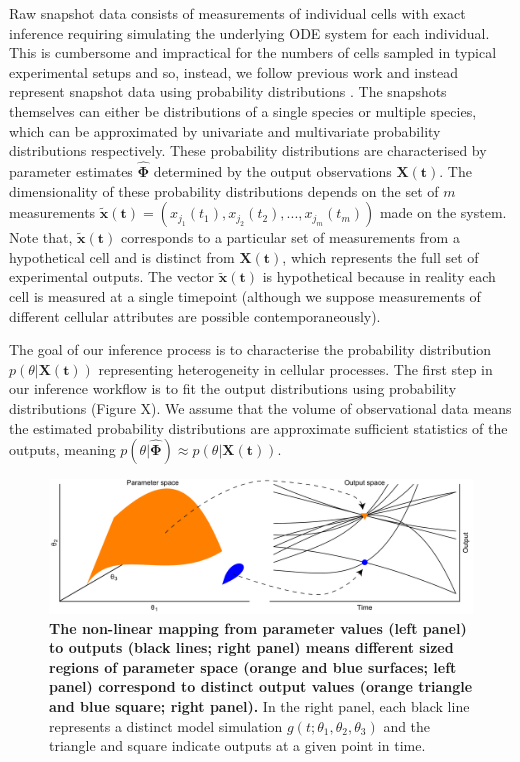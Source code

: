 \documentclass[10pt,letterpaper]{article}
\begin{document}
Raw snapshot data consists of measurements of individual cells with exact inference requiring simulating the underlying ODE system for each individual. This is cumbersome and impractical for the numbers of cells sampled in typical experimental setups and so, instead, we follow previous work and instead represent snapshot data using probability distributions \cite{hasenauer2011identification,hasenauer2014ode,loos2018hierarchical,dixit2018maximum}. The snapshots themselves can either be distributions of a single species or multiple species, which can be approximated by univariate and multivariate probability distributions respectively. These probability distributions are characterised by parameter estimates $\hat{\boldsymbol{\Phi}}$ determined by the output observations $\boldsymbol{X}(\boldsymbol{t})$. The dimensionality of these probability distributions depends on the set of $m$ measurements $\tilde{\boldsymbol{x}}(\boldsymbol{t})=(x_{j_1}(t_1), x_{j_2}(t_2), ..., x_{j_m}(t_m))$ made on the system. Note that, $\tilde{\boldsymbol{x}}(\boldsymbol{t})$ corresponds to a particular set of measurements from a hypothetical cell and is distinct from $\boldsymbol{X}(\boldsymbol{t})$, which represents the full set of experimental outputs. The vector $\tilde{\boldsymbol{x}}(\boldsymbol{t})$ is hypothetical because in reality each cell is measured at a single timepoint (although we suppose measurements of different cellular attributes are possible contemporaneously).

The goal of our inference process is to  characterise the probability distribution $p(\theta|\boldsymbol{X}(\boldsymbol{t}))$ representing heterogeneity in cellular processes. The first step in our inference workflow is to fit the output distributions using probability distributions (Figure X). We assume that the volume of observational data means the estimated probability distributions are approximate sufficient statistics of the outputs, meaning $p(\theta|\hat{\boldsymbol{\Phi}}) \approx p(\theta|\boldsymbol{X}(\boldsymbol{t}))$.

\begin{figure}[H]
	\centerline{\includegraphics[width=\textwidth]{../figures/contour_volumes.pdf}}
	\caption{\textbf{The non-linear mapping from parameter values (left panel) to outputs (black lines; right panel) means different sized regions of parameter space (orange and blue surfaces; left panel) correspond to distinct output values (orange triangle and blue square; right panel).} In the right panel, each black line represents a distinct model simulation $g(t; \theta_1, \theta_2, \theta_3)$ and the triangle and square indicate outputs at a given point in time.}
	\label{fig:contour_volumes}
\end{figure}
\end{document}
